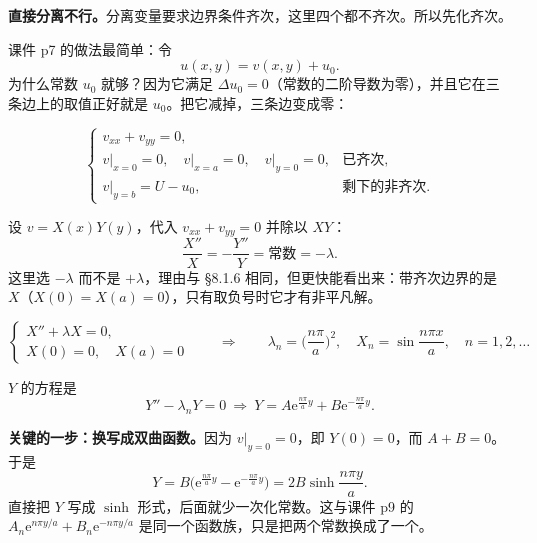 \textbf{直接分离不行。}分离变量要求边界条件齐次，这里四个都不齐次。所以先化齐次。

课件 p7 的做法最简单：令
\begin{equation}
  u(x,y)=v(x,y)+u_0 .
\end{equation}
为什么常数 $u_0$ 就够？因为它满足 $\Delta u_0=0$（常数的二阶导数为零），并且它在三条边上的取值正好就是 $u_0$。把它减掉，三条边变成零：

\begin{equation}
  \begin{cases}
    v_{xx}+v_{yy}=0,\\
    v\big|_{x=0}=0,\quad v\big|_{x=a}=0,\quad v\big|_{y=0}=0, & \text{已齐次},\\
    v\big|_{y=b}=U-u_0, & \text{剩下的非齐次}.
  \end{cases}
\end{equation}



设 $v=X(x)Y(y)$，代入 $v_{xx}+v_{yy}=0$ 并除以 $XY$：
\begin{equation}
  \frac{X''}{X}=-\frac{Y''}{Y}=\text{常数}=-\lambda .
\end{equation}
这里选 $-\lambda$ 而不是 $+\lambda$，理由与 \S8.1.6 相同，但更快能看出来：带齐次边界的是 $X$（$X(0)=X(a)=0$），只有取负号时它才有非平凡解。

\begin{equation}
  \begin{cases}
    X''+\lambda X=0,\\
    X(0)=0,\quad X(a)=0
  \end{cases}
  \qquad\Longrightarrow\qquad
  \lambda_n=\Big(\frac{n\pi}{a}\Big)^2,\quad X_n=\sin\frac{n\pi x}{a},\quad n=1,2,\dots
\end{equation}

$Y$ 的方程是
\begin{equation}
  Y''-\lambda_nY=0\ \Longrightarrow\ Y=A\mathrm e^{\frac{n\pi}{a}y}+B\mathrm e^{-\frac{n\pi}{a}y}.
\end{equation}

\textbf{关键的一步：换写成双曲函数。}因为 $v\big|_{y=0}=0$，即 $Y(0)=0$，而 $A+B=0$。于是
\begin{equation}
  Y=B\big(\mathrm e^{\frac{n\pi}{a}y}-\mathrm e^{-\frac{n\pi}{a}y}\big)=2B\sinh\frac{n\pi y}{a}.
\end{equation}
直接把 $Y$ 写成 $\sinh$ 形式，后面就少一次化常数。这与课件 p9 的 $A_n\mathrm e^{n\pi y/a}+B_n\mathrm e^{-n\pi y/a}$ 是同一个函数族，只是把两个常数换成了一个。


